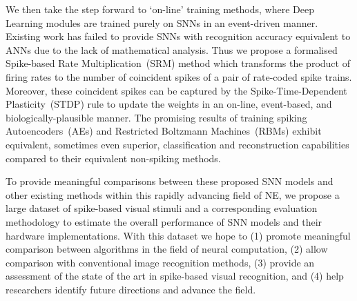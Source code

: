 We then take the step forward to `on-line' training methods, where Deep Learning modules are trained purely on SNNs in an event-driven manner.
Existing work has failed to provide SNNs with recognition accuracy equivalent to ANNs due to the lack of mathematical analysis. 
Thus we propose a formalised Spike-based Rate Multiplication~(SRM) method which transforms the product of firing rates to the number of coincident spikes of a pair of rate-coded spike trains.
Moreover, these coincident spikes can be captured by the Spike-Time-Dependent Plasticity~(STDP) rule to update the weights in an on-line, event-based, and biologically-plausible manner.
The promising results of training spiking Autoencoders~(AEs) and Restricted Boltzmann Machines~(RBMs) exhibit equivalent, sometimes even superior, classification and reconstruction capabilities compared to their equivalent non-spiking methods.

To provide meaningful comparisons between these proposed SNN models and other existing methods within this rapidly advancing field of NE, we propose a large dataset of spike-based visual stimuli and a corresponding evaluation methodology to estimate the overall performance of SNN models and their hardware implementations.
With this dataset we hope to (1) promote meaningful comparison between algorithms in the field of neural computation, (2) allow comparison with conventional image recognition methods, (3) provide an assessment of the state of the art in spike-based visual recognition, and (4) help researchers identify future directions and advance the field.

%

